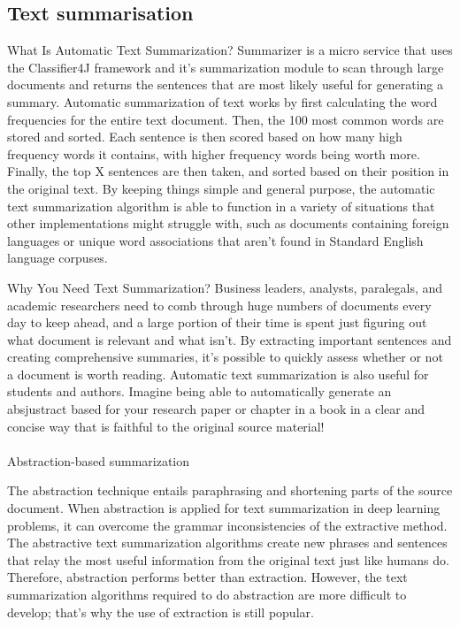 \documentclass[12pt,a4paper]{article}
\begin{document}
\subsection{Text summarisation}
\par What Is Automatic Text Summarization? Summarizer is a micro service that uses the Classifier4J framework and it’s summarization module to scan through large documents and returns the sentences that are most likely useful for generating a summary.
Automatic summarization of text works by first calculating the word frequencies for the entire text document. Then, the 100 most common words are stored and sorted. Each sentence is then scored based on how many high frequency words it contains, with higher frequency words being worth more. Finally, the top X sentences are then taken, and sorted based on their position in the original text.
By keeping things simple and general purpose, the automatic text summarization algorithm is able to function in a variety of situations that other implementations might struggle with, such as documents containing foreign languages or unique word associations that aren’t found in Standard English language corpuses.
\par Why You Need Text Summarization? Business leaders, analysts, paralegals, and academic researchers need to comb through huge numbers of documents every day to keep ahead, and a large portion of their time is spent just figuring out what document is relevant and what isn’t. By extracting important sentences and creating comprehensive summaries, it’s possible to quickly assess whether or not a document is worth reading.
Automatic text summarization is also useful for students and authors. Imagine being able to automatically generate an absjustract based for your research paper or chapter in a book in a clear and concise way that is faithful to the original source material!
\\\\	Abstraction-based summarization
\par The abstraction technique entails paraphrasing and shortening parts of the source document. When abstraction is applied for text summarization in deep learning problems, it can overcome the grammar inconsistencies of the extractive method.
The abstractive text summarization algorithms create new phrases and sentences that relay the most useful information from the original text just like humans do.
Therefore, abstraction performs better than extraction. However, the text summarization algorithms required to do abstraction are more difficult to develop; that’s why the use of extraction is still popular.
\end{document}
